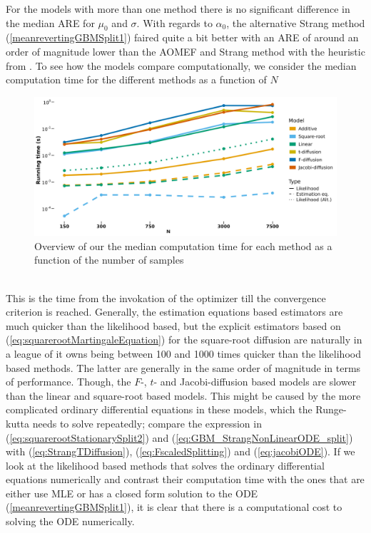 For the models with more than one method there is no significant difference in the median ARE for $\mu_0$ and $\sigma$. With regards to $\alpha_0$, the alternative Strang method (\ref{meanrevertingGBMSplit1}) faired quite a bit better with an ARE of around an order of magnitude lower than the AOMEF and Strang method with the heuristic from \cite{SplittingSchemes}. To see how the models compare computationally, we consider the median computation time for the different methods as a function of $N$
\begin{figure}[h]
    \begin{center}
    \includegraphics[scale = .075]{figures/estimation_duration_stationary.jpeg}
    \caption{Overview of our the median computation time for each method as a function of the number of samples}
    \label{figure:overviewOfDurationStationary}
    \end{center}
\end{figure}\\
This is the time from the invokation of the optimizer till the convergence criterion is reached. Generally, the estimation equations based estimators are much quicker than the likelihood based, but the explicit estimators based on (\ref{eq:squarerootMartingaleEquation}) for the square-root diffusion are naturally in a league of it owns being between 100 and 1000 times quicker than the likelihood based methods. The latter are generally in the same order of magnitude in terms of performance. Though, the $F$-, $t$- and Jacobi-diffusion based models are slower than the linear and square-root based models. This might be caused by the more complicated ordinary differential equations in these models, which the Runge-kutta needs to solve repeatedly; compare the expression in (\ref{eq:squarerootStationarySplit2}) and (\ref{eq:GBM_StrangNonLinearODE_split}) with (\ref{eq:StrangTDiffusion}), (\ref{eq:FscaledSplitting}) and (\ref{eq:jacobiODE}). If we look at the likelihood based methods that solves the ordinary differential equations numerically and contrast their computation time with the ones that are either use MLE or has a closed form solution to the ODE (\ref{meanrevertingGBMSplit1}), it is clear that there is a computational cost to solving the ODE numerically.
